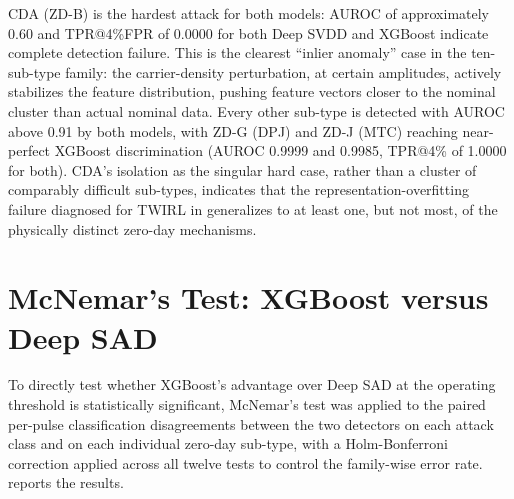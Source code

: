 \documentclass[12pt, a4paper]{report}
\begin{document}
CDA (ZD-B) is the hardest attack for both models: AUROC of approximately 0.60 and TPR@4\%FPR of 0.0000 for both Deep SVDD and XGBoost indicate complete detection failure. This is the clearest ``inlier anomaly'' case in the ten-sub-type family: the carrier-density perturbation, at certain amplitudes, actively stabilizes the feature distribution, pushing feature vectors closer to the nominal cluster than actual nominal data. Every other sub-type is detected with AUROC above 0.91 by both models, with ZD-G (DPJ) and ZD-J (MTC) reaching near-perfect XGBoost discrimination (AUROC 0.9999 and 0.9985, TPR@4\% of 1.0000 for both). CDA's isolation as the singular hard case, rather than a cluster of comparably difficult sub-types, indicates that the representation-overfitting failure diagnosed for TWIRL in  generalizes to at least one, but not most, of the physically distinct zero-day mechanisms.

\section{McNemar's Test: XGBoost versus Deep SAD}\label{sec:statval_mcnemar}
To directly test whether XGBoost's advantage over Deep SAD at the operating threshold is statistically significant, McNemar's test was applied to the paired per-pulse classification disagreements between the two detectors on each attack class and on each individual zero-day sub-type, with a Holm-Bonferroni correction applied across all twelve tests to control the family-wise error rate.  reports the results.
\end{document}
